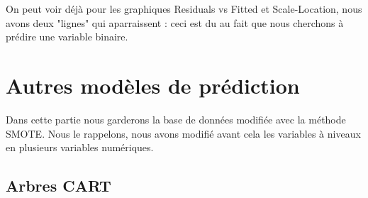 \documentclass{article}
\begin{document}
On peut voir déjà pour les graphiques Residuals vs Fitted et Scale-Location, nous avons deux "lignes" qui aparraissent : ceci est du au fait que nous cherchons à prédire une variable binaire. 

\section{Autres modèles de prédiction}

Dans cette partie nous garderons la base de données modifiée avec la méthode SMOTE. Nous le rappelons, nous avons modifié avant cela les variables à niveaux en plusieurs variables numériques. 

\subsection{Arbres CART}
\end{document}
